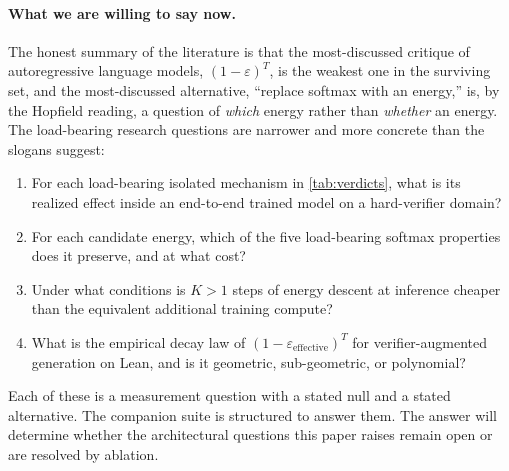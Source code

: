 \paragraph{What we are willing to say now.}
The honest summary of the literature is that the most-discussed critique of autoregressive language models, $(1-\varepsilon)^T$, is the weakest one in the surviving set, and the most-discussed alternative, ``replace softmax with an energy,'' is, by the Hopfield reading, a question of \emph{which} energy rather than \emph{whether} an energy.
The load-bearing research questions are narrower and more concrete than the slogans suggest:
\begin{enumerate}
  \item For each load-bearing isolated mechanism in \cref{tab:verdicts}, what is its realized effect inside an end-to-end trained model on a hard-verifier domain?
  \item For each candidate energy, which of the five load-bearing softmax properties does it preserve, and at what cost?
  \item Under what conditions is $K > 1$ steps of energy descent at inference cheaper than the equivalent additional training compute?
  \item What is the empirical decay law of $(1-\varepsilon_{\mathrm{effective}})^T$ for verifier-augmented generation on Lean, and is it geometric, sub-geometric, or polynomial?
\end{enumerate}
Each of these is a measurement question with a stated null and a stated alternative.
The companion suite is structured to answer them.
The answer will determine whether the architectural questions this paper raises remain open or are resolved by ablation.
